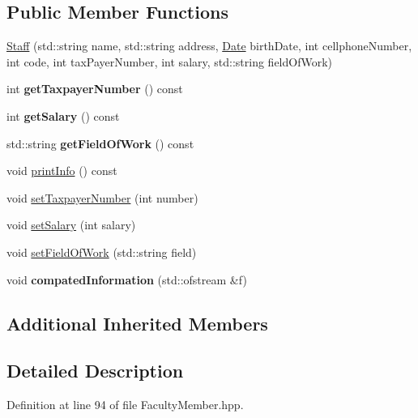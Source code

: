 \subsection*{Public Member Functions}
\begin{DoxyCompactItemize}
\item 
\hyperlink{classStaff_af590aec2ea7c88fd95486c2fa5f92b2f}{Staff} (std\+::string name, std\+::string address, \hyperlink{classDate}{Date} birth\+Date, int cellphone\+Number, int code, int tax\+Payer\+Number, int salary, std\+::string field\+Of\+Work)
\item 
\mbox{\label{classStaff_ae763bc48a07f1195bc31610bb6db583b}} 
int {\bfseries get\+Taxpayer\+Number} () const
\item 
\mbox{\label{classStaff_a6a60b9d148150ac0bda240209ab5443c}} 
int {\bfseries get\+Salary} () const
\item 
\mbox{\label{classStaff_a676f998076ace5103cf199004ed6f898}} 
std\+::string {\bfseries get\+Field\+Of\+Work} () const
\item 
void \hyperlink{classStaff_a3b9babe4708b787b8aeb4d02be4ba1eb}{print\+Info} () const
\item 
void \hyperlink{classStaff_a383d6f3eeebdbf7fd7ff86f4e43bde99}{set\+Taxpayer\+Number} (int number)
\item 
void \hyperlink{classStaff_a70d472e604f726f11bd01bfe325b8216}{set\+Salary} (int salary)
\item 
void \hyperlink{classStaff_a3522c4036c9fcc08d2cd2ad4032ef507}{set\+Field\+Of\+Work} (std\+::string field)
\item 
\mbox{\label{classStaff_a54ca19b398f976ce2524256d766a0ec9}} 
void {\bfseries compated\+Information} (std\+::ofstream \&f)
\end{DoxyCompactItemize}
\subsection*{Additional Inherited Members}


\subsection{Detailed Description}


Definition at line 94 of file Faculty\+Member.\+hpp.




